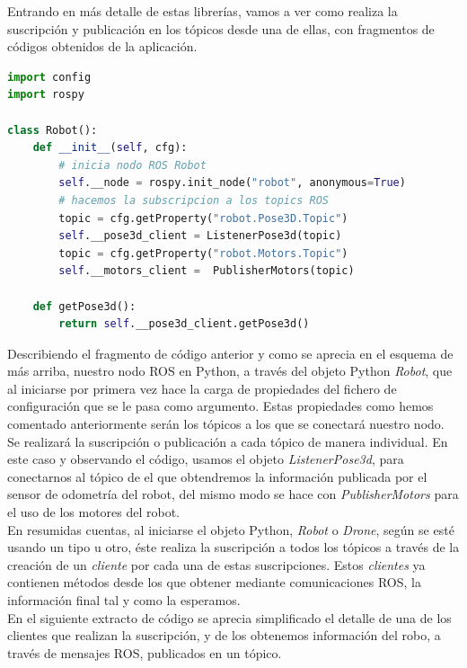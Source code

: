 Entrando en más detalle de estas librerías, vamos a ver como realiza la suscripción y publicación en los tópicos desde una de ellas, con fragmentos de códigos obtenidos de la aplicación.\\

\begin{lstlisting}[language=python,firstnumber=1]
import config
import rospy

class Robot():
    def __init__(self, cfg):
        # inicia nodo ROS Robot
        self.__node = rospy.init_node("robot", anonymous=True)
        # hacemos la subscripcion a los topics ROS
        topic = cfg.getProperty("robot.Pose3D.Topic")
        self.__pose3d_client = ListenerPose3d(topic)
        topic = cfg.getProperty("robot.Motors.Topic")
        self.__motors_client =  PublisherMotors(topic)
        
	def getPose3d():
		return self.__pose3d_client.getPose3d()
\end{lstlisting}

Describiendo el fragmento de código anterior y como se aprecia en el esquema de más arriba, nuestro nodo ROS en Python, a través del objeto Python \textit{Robot}, que al iniciarse por primera vez hace la carga de propiedades del fichero de configuración que se le pasa como argumento. Estas propiedades como hemos comentado anteriormente serán los tópicos a los que se conectará nuestro nodo. Se realizará la suscripción o publicación a cada tópico de manera individual. En este caso y observando el código,  usamos el objeto \textit{ListenerPose3d}, para conectarnos al tópico de el que obtendremos la información publicada por el sensor de odometría del robot, del mismo modo se hace con \textit{PublisherMotors} para el uso de los motores del robot.\\

En resumidas cuentas, al iniciarse el objeto Python, \textit{Robot} o \textit{Drone}, según se esté usando un tipo u otro, éste realiza la suscripción a todos los tópicos a través de la creación de un \textit{cliente} por cada una de estas suscripciones. Estos \textit{clientes} ya contienen métodos desde los que obtener mediante comunicaciones ROS, la información final tal y como la esperamos.\\

En el siguiente extracto de código se aprecia simplificado el detalle de una de los clientes que realizan la suscripción, y de los obtenemos información del robo, a través de mensajes ROS, publicados en un tópico.

